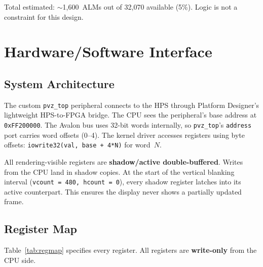 \documentclass[11pt,letterpaper]{article}
\begin{document}
Total estimated: $\sim$1{,}600~ALMs out of 32{,}070 available (5\%).
Logic is not a constraint for this design.

\section{Hardware/Software Interface}
\label{sec:hwsw}

\subsection{System Architecture}

The custom \texttt{pvz\_top} peripheral connects to the HPS through
Platform Designer's lightweight HPS-to-FPGA bridge. The CPU sees the
peripheral's base address at \texttt{0xFF200000}. The Avalon bus uses
32-bit words internally, so \texttt{pvz\_top}'s \texttt{address} port
carries word offsets (0--4). The kernel driver accesses registers using
byte offsets: \texttt{iowrite32(val, base + 4*N)} for word~$N$.

All rendering-visible registers are \textbf{shadow/active
double-buffered}. Writes from the CPU land in shadow copies. At the
start of the vertical blanking interval (\texttt{vcount\,=\,480,
hcount\,=\,0}), every shadow register latches into its active
counterpart. This ensures the display never shows a partially updated
frame.

\subsection{Register Map}

Table~\ref{tab:regmap} specifies every register. All registers are
\textbf{write-only} from the CPU side.
\end{document}
